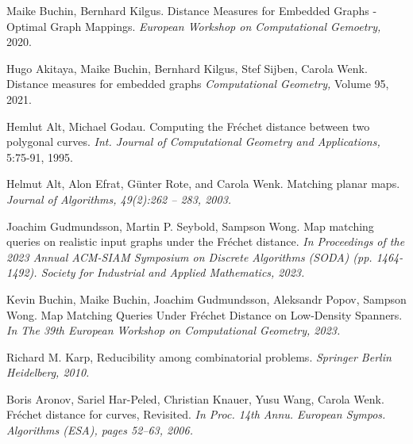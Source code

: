 \documentclass[a4paper, 12pt, twoside]{article}
\theoremstyle{Format1} %
\begin{document}
\begin{thebibliography}{3}
		Maike Buchin, Bernhard Kilgus. Distance Measures for Embedded Graphs - Optimal Graph Mappings.
		\textit{European Workshop on Computational Gemoetry,} 2020.

		Hugo Akitaya, Maike Buchin, Bernhard Kilgus, Stef Sijben, Carola Wenk. Distance measures for embedded graphs
		\textit{Computational Geometry,} Volume 95, 2021.

		Hemlut Alt, Michael Godau. Computing the Fréchet distance between two polygonal curves.
		\textit{Int. Journal of Computational Geometry and Applications,} 5:75-91, 1995.

		Helmut Alt, Alon Efrat, Günter Rote, and Carola Wenk. Matching planar maps.
		\textit{Journal of Algorithms, 49(2):262 – 283, 2003.}

		Joachim Gudmundsson, Martin P. Seybold, Sampson Wong. Map matching queries on realistic input graphs under the Fréchet distance.
		\textit{In Proceedings of the 2023 Annual ACM-SIAM Symposium on Discrete Algorithms (SODA) (pp. 1464-1492). Society for Industrial and Applied Mathematics, 2023.}

		Kevin Buchin, Maike Buchin, Joachim Gudmundsson, Aleksandr Popov, Sampson Wong. Map Matching Queries Under Fréchet Distance on Low-Density Spanners.
		\textit{In The 39th European Workshop on Computational Geometry, 2023.}

		Richard M. Karp, Reducibility among combinatorial problems.
		\textit{Springer Berlin Heidelberg, 2010.}

		Boris Aronov, Sariel Har-Peled, Christian Knauer, Yusu Wang, Carola Wenk. Fréchet distance for curves, Revisited.
		\textit{In Proc. 14th Annu. European Sympos. Algorithms (ESA), pages 52–63, 2006.}

\end{thebibliography}


\end{document}
